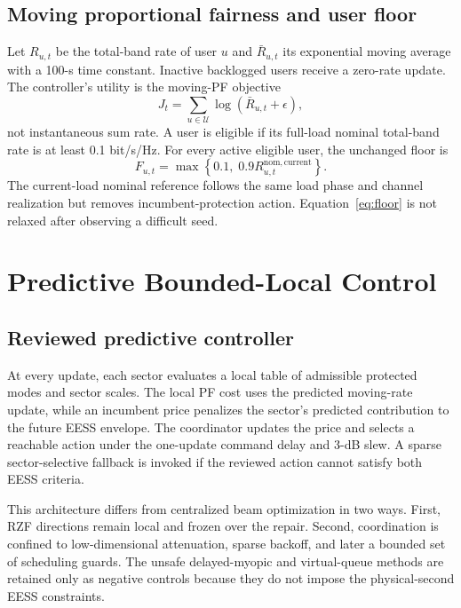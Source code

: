 \documentclass[journal]{IEEEtran}
\newcommand{\U}{\mathcal{U}}
\begin{document}
\subsection{Moving proportional fairness and user floor}
Let $R_{u,t}$ be the total-band rate of user $u$ and $\bar R_{u,t}$ its exponential moving average with a 100-s time constant. Inactive backlogged users receive a zero-rate update. The controller's utility is the moving-PF objective
\begin{equation}
 J_t=\sum_{u\in\U}\log\!\left(\bar R_{u,t}+\epsilon\right),
 \label{eq:pf}
\end{equation}
not instantaneous sum rate. A user is eligible if its full-load nominal total-band rate is at least 0.1 bit/s/Hz. For every active eligible user, the unchanged floor is
\begin{equation}
 F_{u,t}=\max\!\left\{0.1,\;0.9R^{\mathrm{nom,current}}_{u,t}\right\}.
 \label{eq:floor}
\end{equation}
The current-load nominal reference follows the same load phase and channel realization but removes incumbent-protection action. Equation~\eqref{eq:floor} is not relaxed after observing a difficult seed.

\section{Predictive Bounded-Local Control}
\subsection{Reviewed predictive controller}
At every update, each sector evaluates a local table of admissible protected modes and sector scales. The local PF cost uses the predicted moving-rate update, while an incumbent price penalizes the sector's predicted contribution to the future EESS envelope. The coordinator updates the price and selects a reachable action under the one-update command delay and 3-dB slew. A sparse sector-selective fallback is invoked if the reviewed action cannot satisfy both EESS criteria.

This architecture differs from centralized beam optimization in two ways. First, RZF directions remain local and frozen over the repair. Second, coordination is confined to low-dimensional attenuation, sparse backoff, and later a bounded set of scheduling guards. The unsafe delayed-myopic and virtual-queue methods are retained only as negative controls because they do not impose the physical-second EESS constraints.
\end{document}
